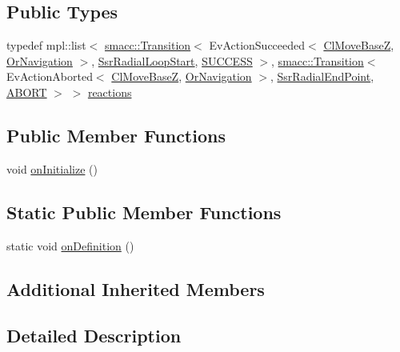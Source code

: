 \subsection*{Public Types}
\begin{DoxyCompactItemize}
\item 
typedef mpl\+::list$<$ \hyperlink{classsmacc_1_1Transition}{smacc\+::\+Transition}$<$ Ev\+Action\+Succeeded$<$ \hyperlink{classmove__base__z__client_1_1ClMoveBaseZ}{Cl\+Move\+BaseZ}, \hyperlink{classsm__dance__bot_1_1OrNavigation}{Or\+Navigation} $>$, \hyperlink{structsm__dance__bot_1_1radial__motion__states_1_1SsrRadialLoopStart}{Ssr\+Radial\+Loop\+Start}, \hyperlink{classSUCCESS}{S\+U\+C\+C\+E\+SS} $>$, \hyperlink{classsmacc_1_1Transition}{smacc\+::\+Transition}$<$ Ev\+Action\+Aborted$<$ \hyperlink{classmove__base__z__client_1_1ClMoveBaseZ}{Cl\+Move\+BaseZ}, \hyperlink{classsm__dance__bot_1_1OrNavigation}{Or\+Navigation} $>$, \hyperlink{structsm__dance__bot_1_1radial__motion__states_1_1SsrRadialEndPoint}{Ssr\+Radial\+End\+Point}, \hyperlink{classABORT}{A\+B\+O\+RT} $>$ $>$ \hyperlink{structsm__dance__bot_1_1radial__motion__states_1_1SsrRadialReturn_aafdc388c777da4c251b54af81bb53caa}{reactions}
\end{DoxyCompactItemize}
\subsection*{Public Member Functions}
\begin{DoxyCompactItemize}
\item 
void \hyperlink{structsm__dance__bot_1_1radial__motion__states_1_1SsrRadialReturn_ae6679a43e4fd59fe4315177c88c97bcc}{on\+Initialize} ()
\end{DoxyCompactItemize}
\subsection*{Static Public Member Functions}
\begin{DoxyCompactItemize}
\item 
static void \hyperlink{structsm__dance__bot_1_1radial__motion__states_1_1SsrRadialReturn_a9e9b10cbf23a788aad70e39f314be136}{on\+Definition} ()
\end{DoxyCompactItemize}
\subsection*{Additional Inherited Members}


\subsection{Detailed Description}


